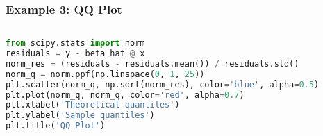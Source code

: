 \documentclass[beamer, en, version=2.0]{huangfusl-template}
\begin{document}
    \begin{frame}[fragile]
        \frametitle{Example 3: QQ Plot}

        \begin{columns}
        \begin{column}{0.5\textwidth}
\begin{lstlisting}[language=python, breaklines]
from scipy.stats import norm
residuals = y - beta_hat @ x
norm_res = (residuals - residuals.mean()) / residuals.std()
norm_q = norm.ppf(np.linspace(0, 1, 25))
plt.scatter(norm_q, np.sort(norm_res), color='blue', alpha=0.5)
plt.plot(norm_q, norm_q, color='red', alpha=0.7)
plt.xlabel('Theoretical quantiles')
plt.ylabel('Sample quantiles')
plt.title('QQ Plot')
\end{lstlisting}
        \end{column}
        \begin{column}{0.5\textwidth}
            
        \end{column}
        \end{columns}
    \end{frame}
    \begin{frame}
        \mythanks
    \end{frame}
\end{document}
